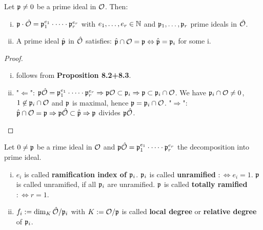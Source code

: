 \begin{Bem}
	Let $\mathfrak{p} \neq 0$ be a prime ideal in $\mathcal{O}$. Then:
	\begin{enumerate}[(i)]
		\item $\mathfrak{p} \cdot \hat{\mathcal{O}} = \mathfrak{p}_1^{e_1} \cdot \dots \cdot \mathfrak{p}_r^{e_r}$ with $e_1,\dots,e_r \in \mathbb{N}$ and $\mathfrak{p}_1, \dots, \mathfrak{p}_r$ prime ideals in $\hat{\mathcal{O}}$.
		
		\item A prime ideal $\hat{\mathfrak{p}}$ in $\hat{\mathcal{O}}$ satisfies: $\hat{\mathfrak{p}} \cap \mathcal{O} = \mathfrak{p} \Leftrightarrow \hat{\mathfrak{p}} = \mathfrak{p}_i$ for some i.
	\end{enumerate}
\end{Bem}
\begin{proof}
	\begin{enumerate}[(i)]
		\item follows from  \textbf{Proposition 8.2+8.3}.
		
		\item "$\Leftarrow$": $\mathfrak{p}\hat{\mathcal{O}} = \mathfrak{p}_1^{e_1} \cdot \dots \cdot \mathfrak{p}_r^{e_r} \Rightarrow \mathfrak{p}\mathcal{O} \subset \mathfrak{p}_i \Rightarrow \mathfrak{p} \subset \mathfrak{p}_i \cap \mathcal{O}$. We have $\mathfrak{p}_i \cap \mathcal{O} \neq 0$, $1 \not\in \mathfrak{p}_i \cap \mathcal{O}$ and $\mathfrak{p}$ is maximal, hence $\mathfrak{p} = \mathfrak{p}_i \cap \mathcal{O}$.
		"$\Rightarrow$": $\hat{\mathfrak{p}} \cap \mathcal{O} = \mathfrak{p} \Rightarrow \mathfrak{p}\hat{\mathcal{O}} \subset \hat{\mathfrak{p}} \Rightarrow \mathfrak{p}$ divides $\mathfrak{p}\hat{\mathcal{O}}$.
	\end{enumerate}
\end{proof}

\begin{defi}
	Let $0 \neq \mathfrak{p}$ be a rime ideal in $\mathcal{O}$ and $\mathfrak{p}\hat{\mathcal{O}} = \mathfrak{p}_1^{e_1} \cdot \dots \cdot \mathfrak{p}_r^{e_r}$ the decomposition into prime ideal.
	\begin{enumerate}[(i)]
		\item $e_i$ is called \textbf{ramification index of $\mathfrak{p}_i$}. $\mathfrak{p}_i$ is called \textbf{unramified} $:\Leftrightarrow e_i = 1$. $\mathfrak{p}$ is called unramified, if all $\mathfrak{p}_i$ are unramified. $\mathfrak{p}$ is called \textbf{totally ramified} $:\Leftrightarrow r = 1$. 
		
		\item $f_i : = \dim_K \hat{\mathcal{O}} / \mathfrak{p}_i$ with $K:=\mathcal{O}/\mathfrak{p}$ is called \textbf{local degree} or \textbf{relative degree} of $\mathfrak{p}_i$.
	\end{enumerate}
\end{defi}


